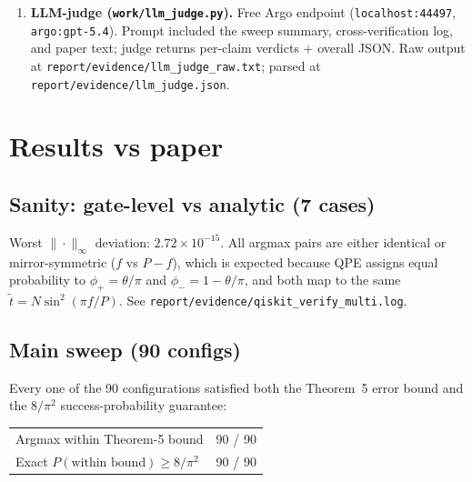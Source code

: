 \documentclass[11pt]{article}
\begin{document}
\begin{enumerate}
        Configurations: $n\in\{4,5,6\}$, $t$ values per~$n$ ($\{1,3,6,10,15\}$;
        $\{1,5,12,20,27,31\}$; $\{1,10,25,40,55,63\}$), and
        $p\in\{3,4,5,6,7,8\}$, giving 90 rows. For each row we record
        $\tilde t_{\mathrm{argmax}}$, $|t-\tilde t|$, the Theorem~5 bound, and
        the \emph{exact} probability that the measurement lands in the
        ``success'' set $\{f : |t - N\sin^2(\pi f/P)| < \text{bound}\}$.
  \item \textbf{LLM-judge (\texttt{work/llm\_judge.py}).}
        Free Argo endpoint (\texttt{localhost:44497}, \texttt{argo:gpt-5.4}).
        Prompt included the sweep summary, cross-verification log, and paper
        text; judge returns per-claim verdicts + overall JSON.
        Raw output at \texttt{report/evidence/llm\_judge\_raw.txt}; parsed at
        \texttt{report/evidence/llm\_judge.json}.
\end{enumerate}

\section{Results vs paper}
\subsection{Sanity: gate-level vs analytic (7 cases)}
Worst $\|\cdot\|_\infty$ deviation: $2.72\times10^{-15}$. All argmax pairs are
either identical or mirror-symmetric ($f$ vs $P-f$), which is expected because
QPE assigns equal probability to $\phi_+ = \theta/\pi$ and
$\phi_- = 1 - \theta/\pi$, and both map to the same
$\tilde t = N\sin^2(\pi f/P)$.
See \texttt{report/evidence/qiskit\_verify\_multi.log}.

\subsection{Main sweep (90 configs)}
Every one of the 90 configurations satisfied both the Theorem~5 error bound and
the $8/\pi^2$ success-probability guarantee:
\begin{center}\begin{tabular}{lc}\toprule
Argmax within Theorem-5 bound & 90 / 90\\
Exact $P(\text{within bound}) \ge 8/\pi^2$ & 90 / 90\\
\bottomrule\end{tabular}\end{center}
\end{document}
